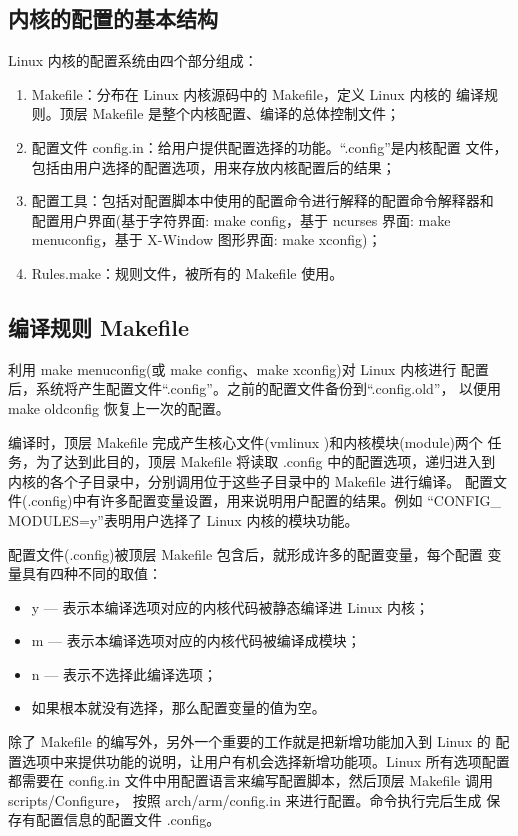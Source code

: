 \subsection{内核的配置的基本结构}
	Linux 内核的配置系统由四个部分组成：
\begin{enumerate}\itemsep=-3pt
  \item Makefile：分布在 Linux 内核源码中的 Makefile，定义 Linux 内核的
		编译规则。顶层 Makefile 是整个内核配置、编译的总体控制文件；
  \item 配置文件 config.in：给用户提供配置选择的功能。``.config''是内核配置
		文件，包括由用户选择的配置选项，用来存放内核配置后的结果；
  \item 配置工具：包括对配置脚本中使用的配置命令进行解释的配置命令解释器和
		配置用户界面(基于字符界面: make config，基于 ncurses 界面: make 
		menuconfig，基于 X-Window 图形界面: make xconfig)；
  \item Rules.make：规则文件，被所有的 Makefile 使用。
\end{enumerate}
\subsection{编译规则 Makefile}
	利用 make menuconfig(或 make config、make xconfig)对 Linux 内核进行
配置后，系统将产生配置文件``.config''。之前的配置文件备份到``.config.old''，
以便用 make oldconfig 恢复上一次的配置。

	编译时，顶层 Makefile 完成产生核心文件(vmlinux )和内核模块(module)两个
任务，为了达到此目的，顶层 Makefile 将读取 .config 中的配置选项，递归进入到
内核的各个子目录中，分别调用位于这些子目录中的 Makefile 进行编译。
配置文件(.config)中有许多配置变量设置，用来说明用户配置的结果。例如
``CONFIG\_ MODULES=y''表明用户选择了 Linux 内核的模块功能。

	配置文件(.config)被顶层 Makefile 包含后，就形成许多的配置变量，每个配置
变量具有四种不同的取值：
\begin{itemize}\itemsep=-3pt
  \item y --- 表示本编译选项对应的内核代码被静态编译进 Linux 内核；
  \item m --- 表示本编译选项对应的内核代码被编译成模块；
  \item n --- 表示不选择此编译选项；
  \item 如果根本就没有选择，那么配置变量的值为空。
\end{itemize}

	除了 Makefile 的编写外，另外一个重要的工作就是把新增功能加入到 Linux 的
配置选项中来提供功能的说明，让用户有机会选择新增功能项。Linux 所有选项配置
都需要在 config.in 文件中用配置语言来编写配置脚本，然后顶层 Makefile 调用
scripts/Configure， 按照 arch/arm/config.in 来进行配置。命令执行完后生成
保存有配置信息的配置文件 .config。

